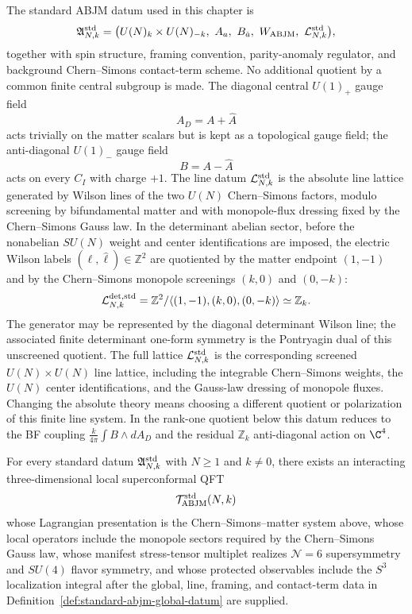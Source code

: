 \begin{definition}
\label{def:standard-abjm-global-datum}
The standard ABJM datum used in this chapter is
\[
  \mathfrak A^{\rm std}_{N,k}
  =
  \bigl(
    U(N)_k\times U(N)_{-k},\ A_a,\ B_{\dot a},\
    W_{\rm ABJM},\ \mathcal L^{\rm std}_{N,k}
  \bigr),
\]
together with spin structure, framing convention, parity-anomaly regulator,
and background Chern--Simons contact-term scheme.  No additional quotient by a
common finite central subgroup is made.  The diagonal central \(U(1)_+\)
gauge field
\[
  A_D=A+\widehat A
\]
acts trivially on the matter scalars but is kept as a topological gauge field;
the anti-diagonal \(U(1)_-\) gauge field
\[
  B=A-\widehat A
\]
acts on every \(C_I\) with charge \(+1\).  The line datum
\(\mathcal L^{\rm std}_{N,k}\) is the absolute line lattice generated by
Wilson lines of the two \(U(N)\) Chern--Simons factors, modulo screening by
bifundamental matter and with monopole-flux dressing fixed by the
Chern--Simons Gauss law.  In the determinant abelian sector, before the
nonabelian \(SU(N)\) weight and center identifications are imposed, the
electric Wilson labels \((\ell,\widehat\ell)\in\mathbb Z^2\) are quotiented by
the matter endpoint \((1,-1)\) and by the Chern--Simons monopole screenings
\((k,0)\) and \((0,-k)\):
\[
  \mathcal L^{\rm det,std}_{N,k}
  =
  \mathbb Z^2/
  \langle(1,-1),(k,0),(0,-k)\rangle
  \simeq \mathbb Z_k .
\]
The generator may be represented by the diagonal determinant Wilson line; the
associated finite determinant one-form symmetry is the Pontryagin dual of this
unscreened quotient.  The full lattice \(\mathcal L^{\rm std}_{N,k}\) is the
corresponding screened \(U(N)\times U(N)\) line lattice, including the
integrable Chern--Simons weights, the \(U(N)\) center identifications, and the
Gauss-law dressing of monopole fluxes.  Changing the absolute theory means
choosing a different quotient or polarization of this finite line system.  In
the rank-one quotient below this datum reduces to the BF coupling
\(\frac{k}{4\pi}\int B\wedge dA_D\) and the residual \(\mathbb Z_k\)
anti-diagonal action on \(\C^4\).
\end{definition}

\begin{conjecture}
\label{conj:standard-abjm-scft-existence}
For every standard datum \(\mathfrak A^{\rm std}_{N,k}\) with
\(N\ge1\) and \(k\ne0\), there exists an interacting three-dimensional local
superconformal QFT
\[
  \mathcal T_{\rm ABJM}^{\rm std}(N,k)
\]
whose Lagrangian presentation is the Chern--Simons--matter system above, whose
local operators include the monopole sectors required by the
Chern--Simons Gauss law, whose manifest stress-tensor multiplet realizes
\(\mathcal N=6\) supersymmetry and \(SU(4)\) flavor symmetry, and whose
protected observables include the \(S^3\) localization integral after the
global, line, framing, and contact-term data in
Definition~\ref{def:standard-abjm-global-datum} are supplied.
\end{conjecture}

